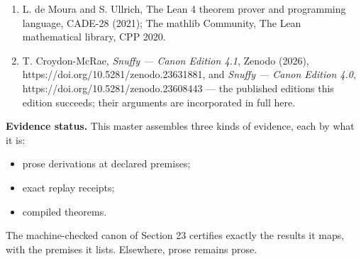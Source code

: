 \documentclass[
]{article}
\providecommand{\tightlist}{%
  \setlength{\itemsep}{0pt}\setlength{\parskip}{0pt}}
\begin{document}
\begin{enumerate}
  codes: towards practical large-scale quantum computation, Phys. Rev.~A
  86 (2012); Google Quantum AI, Quantum error correction below the
  surface code threshold, Nature (2024); S. Krinner et al., Engineering
  cryogenic setups for 100-qubit scale superconducting circuit systems,
  EPJ Quantum Technology 6 (2019). The complete source list of Section
  22 is §22.5.
\item
  L. de Moura and S. Ullrich, The Lean 4 theorem prover and programming
  language, CADE-28 (2021); The mathlib Community, The Lean mathematical
  library, CPP 2020.
\item
  T. Croydon-McRae, \emph{Snuffy --- Canon Edition 4.1}, Zenodo (2026),
  h\allowbreak{}t\allowbreak{}t\allowbreak{}p\allowbreak{}s\allowbreak{}:\allowbreak{}/\allowbreak{}/\allowbreak{}d\allowbreak{}o\allowbreak{}i\allowbreak{}.\allowbreak{}o\allowbreak{}r\allowbreak{}g\allowbreak{}/\allowbreak{}1\allowbreak{}0\allowbreak{}.\allowbreak{}5\allowbreak{}2\allowbreak{}8\allowbreak{}1\allowbreak{}/\allowbreak{}z\allowbreak{}e\allowbreak{}n\allowbreak{}o\allowbreak{}d\allowbreak{}o\allowbreak{}.\allowbreak{}2\allowbreak{}3\allowbreak{}6\allowbreak{}3\allowbreak{}1\allowbreak{}8\allowbreak{}8\allowbreak{}1\allowbreak{},
  and \emph{Snuffy --- Canon Edition 4.0},
  h\allowbreak{}t\allowbreak{}t\allowbreak{}p\allowbreak{}s\allowbreak{}:\allowbreak{}/\allowbreak{}/\allowbreak{}d\allowbreak{}o\allowbreak{}i\allowbreak{}.\allowbreak{}o\allowbreak{}r\allowbreak{}g\allowbreak{}/\allowbreak{}1\allowbreak{}0\allowbreak{}.\allowbreak{}5\allowbreak{}2\allowbreak{}8\allowbreak{}1\allowbreak{}/\allowbreak{}z\allowbreak{}e\allowbreak{}n\allowbreak{}o\allowbreak{}d\allowbreak{}o\allowbreak{}.\allowbreak{}2\allowbreak{}3\allowbreak{}6\allowbreak{}0\allowbreak{}8\allowbreak{}4\allowbreak{}4\allowbreak{}3
  --- the published editions this edition succeeds; their arguments are
  incorporated in full here.
\end{enumerate}

\textbf{Evidence status.} This master assembles three kinds of evidence,
each by what it is:

\begin{itemize}
\tightlist
\item
  prose derivations at declared premises;
\item
  exact replay receipts;
\item
  compiled theorems.
\end{itemize}

The machine-checked canon of Section 23 certifies exactly the results it
maps, with the premises it lists. Elsewhere, prose remains prose.
\end{document}

